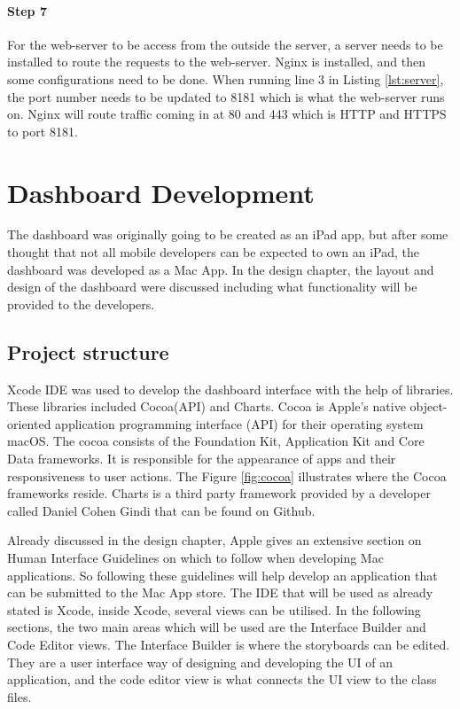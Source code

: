 \paragraph{Step 7}
For the web-server to be access from the outside the server, a server needs to be installed to route the requests to the web-server. Nginx is installed, and then some configurations need to be done. When running line 3 in Listing \ref{lst:server}, the port number needs to be updated to 8181 which is what the web-server runs on. Nginx will route traffic coming in at 80 and 443 which is HTTP and HTTPS to port 8181.


\section{Dashboard Development}

The dashboard was originally going to be created as an iPad app, but after some thought that not all mobile developers can be expected to own an iPad, the dashboard was developed as a Mac App. In the design chapter, the layout and design of the dashboard were discussed including what functionality will be provided to the developers.

\subsection{Project structure}

Xcode IDE was used to develop the dashboard interface with the help of libraries. These libraries included Cocoa(API) and Charts. Cocoa is Apple’s native object-oriented application programming interface (API) for their operating system macOS. The cocoa consists of the Foundation Kit, Application Kit and Core Data frameworks. It is responsible for the appearance of apps and their responsiveness to user actions. The Figure \ref{fig:cocoa} illustrates where the Cocoa frameworks reside. Charts is a third party framework provided by a developer called Daniel Cohen Gindi that can be found on Github. \cite{charts} 

Already discussed in the design chapter, Apple gives an extensive section on Human Interface Guidelines on which to follow when developing Mac applications. So following these guidelines will help develop an application that can be submitted to the Mac App store. The IDE that will be used as already stated is Xcode, inside Xcode, several views can be utilised. In the following sections, the two main areas which will be used are the Interface Builder and Code Editor views. The Interface Builder is where the storyboards can be edited. They are a user interface way of designing and developing the UI of an application, and the code editor view is what connects the UI view to the class files.

